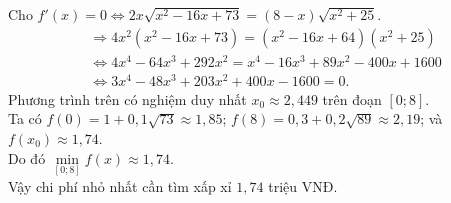 \begin{ex}
{		Cho $f'(x)=0 \Leftrightarrow 2x\sqrt{x^2-16x+73} = (8-x)\sqrt{x^2+25}$.
		\begin{align*}
			&\Rightarrow 4x^2(x^2 - 16x + 73) = (x^2 - 16x + 64)(x^2 + 25) \\
			&\Leftrightarrow 4x^4 - 64x^3 + 292x^2 = x^4 - 16x^3 + 89x^2 - 400x + 1600 \\
			&\Leftrightarrow 3x^4 - 48x^3 + 203x^2 + 400x - 1600 = 0.
		\end{align*}
		Phương trình trên có nghiệm duy nhất $x_0 \approx 2{,}449$ trên đoạn $[0;8]$. \\
		Ta có $f(0) = 1 + 0{,}1\sqrt{73} \approx 1{,}85$; $f(8) = 0{,}3 + 0{,}2\sqrt{89} \approx 2{,}19$; và $f(x_0) \approx 1{,}74$. \\
		Do đó $\min\limits_{[0;8]}f(x) \approx 1{,}74$. \\
		Vậy chi phí nhỏ nhất cần tìm xấp xỉ $1{,}74$ triệu VNĐ.
	}
\end{ex}


